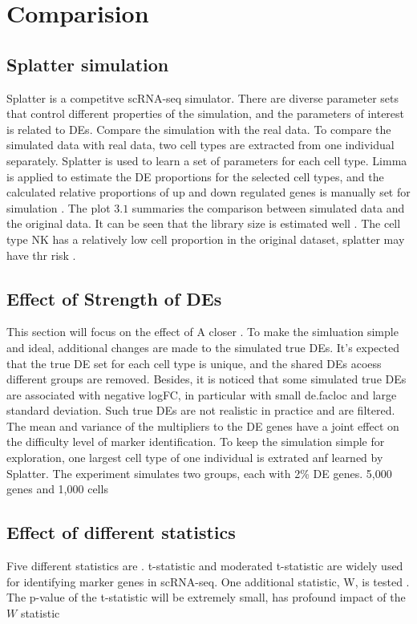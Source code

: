 \chapter{Comparision}
\section{Splatter simulation}
Splatter is a competitve scRNA-seq simulator. 
There are diverse parameter sets that control different properties of the simulation, and the parameters of interest is related to DEs. 
Compare the simulation with the real data. 
To compare the simulated data with real data, two cell types are extracted from one individual separately. Splatter is used to learn a set of parameters for each cell type. 
Limma is applied to estimate the DE proportions for the selected cell types, and the calculated relative proportions of up and down regulated genes is manually set for simulation . 
The plot $3.1$ summaries the comparison between simulated data and the original data. It can be seen that the library size is estimated well . The cell type NK has a relatively low cell proportion in the original dataset, splatter may have thr risk . 
\section{Effect of Strength of DEs }
This section will focus on the effect of 
A closer . To make the simluation simple and ideal, additional changes are made to the simulated true DEs. It's expected that the true DE set for each cell type is unique, and the shared DEs acoess different groups are removed. Besides, it is noticed that some simulated true DEs are associated with negative logFC, in particular with small de.facloc and large standard deviation. Such true DEs are not realistic in practice and are filtered. 
The mean and variance of the multipliers to the DE genes have a joint effect on the difficulty level of marker identification. 
To keep the simulation simple for exploration, one largest cell type of one individual is extrated anf learned by Splatter. The experiment simulates two groups, each with 2\% DE genes. 5,000 genes and 1,000 cells
\section{Effect of different statistics}
Five different statistics are . 
t-statistic and moderated t-statistic are widely used for identifying marker genes in scRNA-seq. 
One additional statistic, W, is tested . 
The p-value of the t-statistic will be extremely small, has profound impact of the $W$ statistic 
